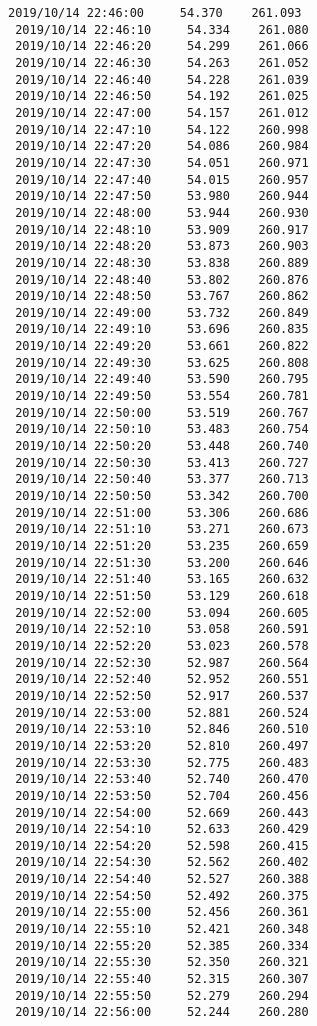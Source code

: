 \documentclass[11pt]{article}
\begin{document}
\begin{Verbatim}[commandchars=\\\{\}]
 2019/10/14 22:46:00     54.370    261.093
 2019/10/14 22:46:10     54.334    261.080
 2019/10/14 22:46:20     54.299    261.066
 2019/10/14 22:46:30     54.263    261.052
 2019/10/14 22:46:40     54.228    261.039
 2019/10/14 22:46:50     54.192    261.025
 2019/10/14 22:47:00     54.157    261.012
 2019/10/14 22:47:10     54.122    260.998
 2019/10/14 22:47:20     54.086    260.984
 2019/10/14 22:47:30     54.051    260.971
 2019/10/14 22:47:40     54.015    260.957
 2019/10/14 22:47:50     53.980    260.944
 2019/10/14 22:48:00     53.944    260.930
 2019/10/14 22:48:10     53.909    260.917
 2019/10/14 22:48:20     53.873    260.903
 2019/10/14 22:48:30     53.838    260.889
 2019/10/14 22:48:40     53.802    260.876
 2019/10/14 22:48:50     53.767    260.862
 2019/10/14 22:49:00     53.732    260.849
 2019/10/14 22:49:10     53.696    260.835
 2019/10/14 22:49:20     53.661    260.822
 2019/10/14 22:49:30     53.625    260.808
 2019/10/14 22:49:40     53.590    260.795
 2019/10/14 22:49:50     53.554    260.781
 2019/10/14 22:50:00     53.519    260.767
 2019/10/14 22:50:10     53.483    260.754
 2019/10/14 22:50:20     53.448    260.740
 2019/10/14 22:50:30     53.413    260.727
 2019/10/14 22:50:40     53.377    260.713
 2019/10/14 22:50:50     53.342    260.700
 2019/10/14 22:51:00     53.306    260.686
 2019/10/14 22:51:10     53.271    260.673
 2019/10/14 22:51:20     53.235    260.659
 2019/10/14 22:51:30     53.200    260.646
 2019/10/14 22:51:40     53.165    260.632
 2019/10/14 22:51:50     53.129    260.618
 2019/10/14 22:52:00     53.094    260.605
 2019/10/14 22:52:10     53.058    260.591
 2019/10/14 22:52:20     53.023    260.578
 2019/10/14 22:52:30     52.987    260.564
 2019/10/14 22:52:40     52.952    260.551
 2019/10/14 22:52:50     52.917    260.537
 2019/10/14 22:53:00     52.881    260.524
 2019/10/14 22:53:10     52.846    260.510
 2019/10/14 22:53:20     52.810    260.497
 2019/10/14 22:53:30     52.775    260.483
 2019/10/14 22:53:40     52.740    260.470
 2019/10/14 22:53:50     52.704    260.456
 2019/10/14 22:54:00     52.669    260.443
 2019/10/14 22:54:10     52.633    260.429
 2019/10/14 22:54:20     52.598    260.415
 2019/10/14 22:54:30     52.562    260.402
 2019/10/14 22:54:40     52.527    260.388
 2019/10/14 22:54:50     52.492    260.375
 2019/10/14 22:55:00     52.456    260.361
 2019/10/14 22:55:10     52.421    260.348
 2019/10/14 22:55:20     52.385    260.334
 2019/10/14 22:55:30     52.350    260.321
 2019/10/14 22:55:40     52.315    260.307
 2019/10/14 22:55:50     52.279    260.294
 2019/10/14 22:56:00     52.244    260.280

\end{Verbatim}
\end{document}
